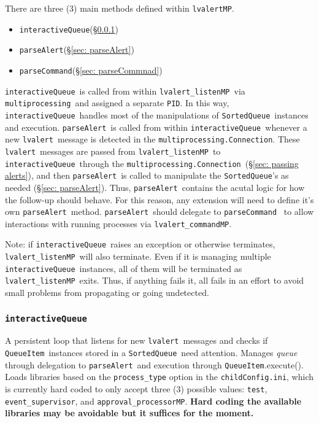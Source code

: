\documentclass{article}
\newcommand{\PID}{\texttt{PID}}
\newcommand{\multiprocessing}{\texttt{multiprocessing}}
\newcommand{\multiprocessingConnection}{\texttt{multiprocessing.Connection}}
\newcommand{\alert}{\texttt{lvalert}}
\newcommand{\lvalertMP}{\texttt{lvalertMP}}
\newcommand{\lvalertListenMP}{\texttt{lvalert\_listenMP}}
\newcommand{\lvalertCommandMP}{\texttt{lvalert\_commandMP}}
\newcommand{\interactiveQueue}{\texttt{interactiveQueue}}
\newcommand{\parseAlert}{\texttt{parseAlert}}
\newcommand{\parseCommand}{\texttt{parseCommand}}
\newcommand{\SortedQueue}{\texttt{SortedQueue}}
\newcommand{\QueueItem}{\texttt{QueueItem}}
\newcommand{\childConfigini}{\texttt{childConfig.ini}}
\newcommand{\approvalProcessor}{\texttt{approval\_processor}}
\newcommand{\eventSupervisor}{\texttt{event\_supervisor}}
\begin{document}
There are three (3) main methods defined within \lvalertMP. 
\begin{itemize}
    \item{\interactiveQueue (\S\ref{sec: interactiveQueue})}
    \item{\parseAlert (\S\ref{sec: parseAlert})}
    \item{\parseCommand (\S\ref{sec: parseCommnad})}
\end{itemize}
\interactiveQueue~is called from within \lvalertListenMP~via \multiprocessing~and assigned a separate \PID.
In this way, \interactiveQueue~handles most of the manipulations of \SortedQueue~instances and execution.
\parseAlert~is called from within \interactiveQueue~whenever a new \alert~message is detected in the \multiprocessingConnection.
These \alert~messages are passed from \lvalertListenMP~to \interactiveQueue~through the \multiprocessingConnection~(\S\ref{sec: passing alerts}), and then \parseAlert~is called to manipulate the \SortedQueue's as needed (\S\ref{sec: parseAlert}).
Thus, \parseAlert~contains the acutal logic for how the follow-up should behave.
For this reason, any extension will need to define it's own \parseAlert~method.
\parseAlert~should delegate to \parseCommand~ to allow interactions with running processes via \lvalertCommandMP.

Note: if \interactiveQueue~raises an exception or otherwise terminates, \lvalertListenMP~will also terminate.
Even if it is managing multiple \interactiveQueue~instances, all of them will be terminated as \lvalertListenMP~exits.
Thus, if anything fails it, all fails in an effort to avoid small problems from propagating or going undetected.


\subsubsection{\interactiveQueue}
\label{sec: interactiveQueue}

A persistent loop that listens for new \alert~messages and checks if \QueueItem~instances stored in a \SortedQueue~need attention. 
Manages \textit{queue} through delegation to \parseAlert~and execution through \QueueItem.execute(). 
Loads libraries based on the \texttt{process\_type} option in the \childConfigini, which is currently hard coded to only accept three (3) possible values: \texttt{test}, \eventSupervisor, and \approvalProcessor\texttt{MP}.
\textbf{Hard coding the available libraries may be avoidable but it suffices for the moment.}
\end{document}
